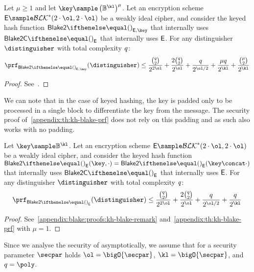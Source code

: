 \begin{theorem}\label{appendix:th:kh-blake-prf}
Let $\mu \geq 1$ and let $\key \sample \left( \BB^\kl \right )^\mu$. Let an encryption scheme $\Enc \sample \blockSet^*(2 \cdot \ol, 2 \cdot \ol)$ be a weakly ideal cipher, and consider the keyed hash function $\blake{2}{}_{\Enc, \key}$ that internally uses $\blake{2C}{}_\Enc$ that internally uses $\mathsf{E}$. For any distinguisher $\distinguisher$ with total complexity $\mathit{q}$:
    \[
        \prf_{\blake{2}{}_{\Enc, \key}}(\distinguisher) \leq \frac{\binom q 2}{2^{2\ol}} + \frac{2 \binom q 2}{2^{\ol}} + \frac{q}{2^{\ol/2}} + \frac{\mu q}{2^\kl} + \frac{\binom \mu 2}{2^\kl}
    \]
\end{theorem}
\begin{proof}
    See~\cite[Corollary 3]{luykx2016security}.
\end{proof}

\begin{remark}\label{appendix:blake:proofs:kh-blake-remark}
We can note that in the case of keyed hashing, the key is padded only to be processed in a single block to differentiate the key from the message. The security proof of~\cref{appendix:th:kh-blake-prf} does not rely on this padding and as such also works with no padding.
\end{remark}

\begin{theorem}\label{appendix:th:blake-prf}
Let $\key \sample \BB^\kl$. Let an encryption scheme $\Enc \sample \blockSet^*(2 \cdot \ol, 2 \cdot \ol)$ be a weakly ideal cipher, and consider the keyed hash function $\blake{2}{}_{\Enc}(\key, \cdot) = \blake{2}{}_\Enc(\key \concat \cdot)$ that internally uses $\blake{2C}{}_\Enc$ that internally uses $\mathsf{E}$. For any distinguisher $\distinguisher$ with total complexity $\mathit{q}$:
    \[
        \prf_{\blake{2}{}_{\Enc}}(\distinguisher) \leq \frac{\binom q 2}{2^{2\ol}} + \frac{2 \binom q 2}{2^{\ol}} + \frac{q}{2^{\ol/2}} + \frac{q}{2^\kl}
    \]
\end{theorem}
\begin{proof}
    See~\cref{appendix:blake:proofs:kh-blake-remark} and~\cref{appendix:th:kh-blake-prf} with $\mu=1$.
\end{proof}

\begin{remark}
  Since we analyse the security of  asymptotically, we assume that for a security parameter $\secpar$ holds $\ol = \bigO{\secpar}$, $\kl = \bigO{\secpar}$, and $q = \poly$.
\end{remark}

